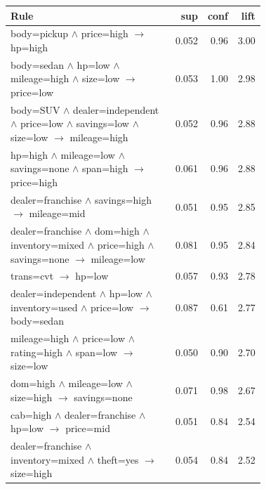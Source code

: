 \begin{tabular}{@{}>{\raggedright\arraybackslash}p{0.72\linewidth}rrr@{}}
\toprule
Rule & sup & conf & lift \\
\midrule
body=pickup $\wedge$ price=high $\rightarrow$ hp=high & 0.052 & 0.96 & 3.00 \\
body=sedan $\wedge$ hp=low $\wedge$ mileage=high $\wedge$ size=low $\rightarrow$ price=low & 0.053 & 1.00 & 2.98 \\
body=SUV $\wedge$ dealer=independent $\wedge$ price=low $\wedge$ savings=low $\wedge$ size=low $\rightarrow$ mileage=high & 0.052 & 0.96 & 2.88 \\
hp=high $\wedge$ mileage=low $\wedge$ savings=none $\wedge$ span=high $\rightarrow$ price=high & 0.061 & 0.96 & 2.88 \\
dealer=franchise $\wedge$ savings=high $\rightarrow$ mileage=mid & 0.051 & 0.95 & 2.85 \\
dealer=franchise $\wedge$ dom=high $\wedge$ inventory=mixed $\wedge$ price=high $\wedge$ savings=none $\rightarrow$ mileage=low & 0.081 & 0.95 & 2.84 \\
trans=cvt $\rightarrow$ hp=low & 0.057 & 0.93 & 2.78 \\
dealer=independent $\wedge$ hp=low $\wedge$ inventory=used $\wedge$ price=low $\rightarrow$ body=sedan & 0.087 & 0.61 & 2.77 \\
mileage=high $\wedge$ price=low $\wedge$ rating=high $\wedge$ span=low $\rightarrow$ size=low & 0.050 & 0.90 & 2.70 \\
dom=high $\wedge$ mileage=low $\wedge$ size=high $\rightarrow$ savings=none & 0.071 & 0.98 & 2.67 \\
cab=high $\wedge$ dealer=franchise $\wedge$ hp=low $\rightarrow$ price=mid & 0.051 & 0.84 & 2.54 \\
dealer=franchise $\wedge$ inventory=mixed $\wedge$ theft=yes $\rightarrow$ size=high & 0.054 & 0.84 & 2.52 \\
\bottomrule
\end{tabular}
